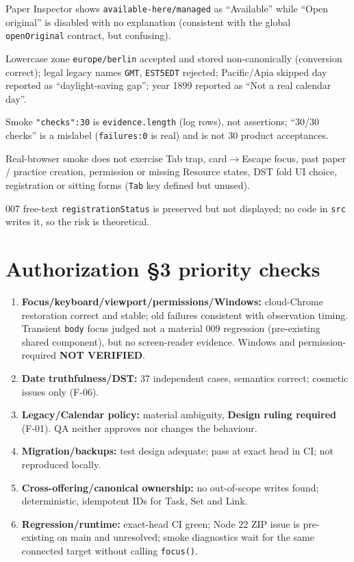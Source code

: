 \documentclass[11pt,a4paper]{article}
\newcommand{\NV}{\textcolor{gray!60!black}{\textbf{NOT VERIFIED}}}
\begin{document}
\begin{description}[style=nextline,leftmargin=0.9cm,nosep]
  \item[F-05 --- Low, UX] Paper Inspector shows \texttt{available-here/managed} as ``Available'' while ``Open original'' is disabled with no explanation (consistent with the global \texttt{openOriginal} contract, but confusing).
  \item[F-06 --- Low, cosmetic] Lowercase zone \texttt{europe/berlin} accepted and stored non-canonically (conversion correct); legal legacy names \texttt{GMT}, \texttt{EST5EDT} rejected; Pacific/Apia skipped day reported as ``daylight-saving gap''; year 1899 reported as ``Not a real calendar day''.
  \item[F-07 --- Low, reporting] Smoke \texttt{"checks":30} is \texttt{evidence.length} (log rows), not assertions; ``30/30 checks'' is a mislabel (\texttt{failures:0} is real) and is not 30 product acceptances.
  \item[F-08 --- Low, coverage] Real-browser smoke does not exercise Tab trap, card$\to$Escape focus, past paper / practice creation, permission or missing Resource states, DST fold UI choice, registration or sitting forms (\texttt{Tab} key defined but unused).
  \item[F-09 --- Info] 007 free-text \texttt{registrationStatus} is preserved but not displayed; no code in \texttt{src} writes it, so the risk is theoretical.
\end{description}

\section{Authorization \S3 priority checks}
\begin{enumerate}[nosep]
  \item \textbf{Focus/keyboard/viewport/permissions/Windows:} cloud-Chrome restoration correct and stable; old failures consistent with observation timing. Transient \texttt{body} focus judged not a material 009 regression (pre-existing shared component), but no screen-reader evidence. Windows and permission-required \NV.
  \item \textbf{Date truthfulness/DST:} 37 independent cases, semantics correct; cosmetic issues only (F-06).
  \item \textbf{Legacy/Calendar policy:} material ambiguity, \textbf{Design ruling required} (F-01). QA neither approves nor changes the behaviour.
  \item \textbf{Migration/backups:} test design adequate; pass at exact head in CI; not reproduced locally.
  \item \textbf{Cross-offering/canonical ownership:} no out-of-scope writes found; deterministic, idempotent IDs for Task, Set and Link.
  \item \textbf{Regression/runtime:} exact-head CI green; Node 22 ZIP issue is pre-existing on main and unresolved; smoke diagnostics wait for the same connected target without calling \texttt{focus()}.
\end{enumerate}
\end{document}
